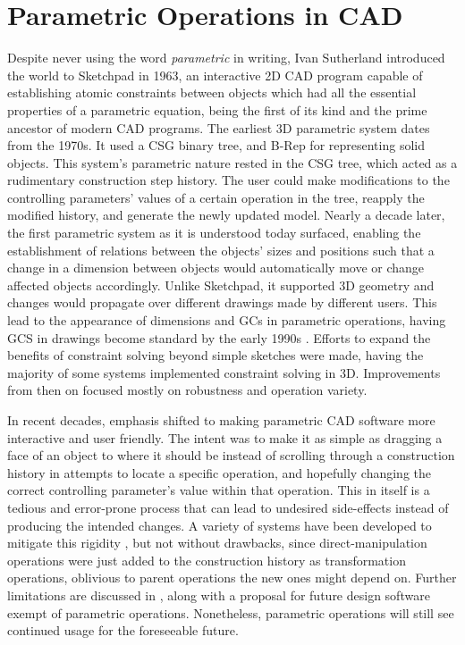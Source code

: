 \section{Parametric Operations in \acs{CAD}}
\label{sec:intro.parametric}

Despite never using the word \textit{parametric} in writing, Ivan Sutherland
introduced the world to Sketchpad \cite{Sutherland:1964:Sketchpad} in 1963, an
interactive 2D \ac{CAD} program capable of establishing atomic constraints
between objects which had all the essential properties of a parametric equation,
being the first of its kind and the prime ancestor of modern \ac{CAD} programs.
The earliest 3D parametric system \cite{Requicha:1980:RRS:356827.356833} dates
from the 1970s.  It used a \ac{CSG} \cite{Foley:1996:CGPP,Requicha:1977:CSG}
binary tree, and \ac{B-Rep} \cite{Stroud:2006:BRMT} for representing solid
objects.  This system's parametric nature rested in the \ac{CSG} tree, which
acted as a rudimentary construction step history.  The user could make
modifications to the controlling parameters' values of a certain operation in
the tree, reapply the modified history, and generate the newly updated model.
Nearly a decade later, the first parametric system as it is understood today
\cite{Jabi:2013:PDA,PTC:1980:ProENGINEER} surfaced, enabling the establishment
of relations between the objects' sizes and positions such that a change in a
dimension between objects would automatically move or change affected objects
accordingly.  Unlike Sketchpad, it supported 3D geometry and changes would
propagate over different drawings made by different users.  This lead to the
appearance of dimensions and \acp{GC} in parametric operations, having \ac{GCS}
in drawings become standard by the early 1990s
\cite{Bouma:1995:GCS,Chung:1990:TEVPD,Owen:1991:ASGDC}.  Efforts to expand the
benefits of constraint solving beyond simple sketches were made, having the
majority of some systems implemented constraint solving in 3D.  Improvements
from then on focused mostly on robustness and operation variety.

In recent decades, emphasis shifted to making parametric \ac{CAD} software more
interactive and user friendly.  The intent was to make it as simple as dragging
a face of an object to where it should be instead of scrolling through a
construction history in attempts to locate a specific operation, and hopefully
changing the correct controlling parameter's value within that operation.  This
in itself is a tedious and error-prone process that can lead to undesired
side-effects instead of producing the intended changes.  A variety of systems
have been developed to mitigate this rigidity
\cite{Clarke:2009:SM,Samuel:2006:CPPUP,Wu:2007:MSMSM}, but not without
drawbacks, since direct-manipulation operations were just added to the
construction history as transformation operations, oblivious to parent
operations the new ones might depend on.  Further limitations are discussed in
\cite{Bettig:2005:LPOSSD}, along with a proposal for future design software
exempt of parametric operations.  Nonetheless, parametric operations will still
see continued usage for the foreseeable future.

